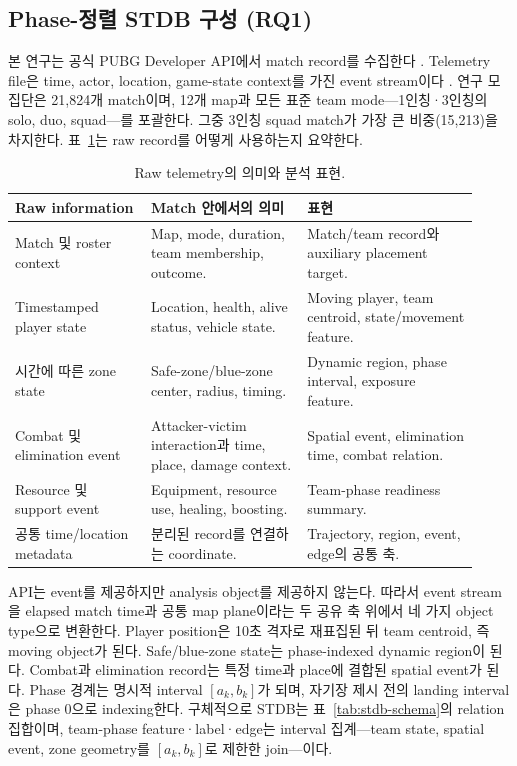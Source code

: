 \subsection{Phase-정렬 STDB 구성 (RQ1)}
\label{sec:methods-data}

본 연구는 공식 PUBG Developer API에서 match record를 수집한다
\cite{pubgDeveloperPortal,pubgTelemetryGuide}. Telemetry file은 time, actor,
location, game-state context를 가진 event stream이다
\cite{pubgTelemetryEvents,pubgTelemetryObjects}. 연구 모집단은 21,824개
match이며, 12개 map과 모든 표준 team mode---1인칭·3인칭의 solo, duo,
squad---를 포괄한다. 그중 3인칭 squad match가 가장 큰 비중(15,213)을
차지한다. 표~\ref{tab:api-fields}는 raw record를 어떻게 사용하는지 요약한다.

\begin{table}[t]
\centering
\caption{Raw telemetry의 의미와 분석 표현.}
\label{tab:api-fields}
\small
\begin{tabular}{p{0.27\linewidth}p{0.31\linewidth}p{0.34\linewidth}}
\toprule
Raw information & Match 안에서의 의미 & 표현 \\
\midrule
Match 및 roster context & Map, mode, duration, team membership, outcome. &
Match/team record와 auxiliary placement target. \\
Timestamped player state & Location, health, alive status, vehicle state. &
Moving player, team centroid, state/movement feature. \\
시간에 따른 zone state & Safe-zone/blue-zone center, radius, timing. &
Dynamic region, phase interval, exposure feature. \\
Combat 및 elimination event & Attacker-victim interaction과 time, place,
damage context. & Spatial event, elimination time, combat relation. \\
Resource 및 support event & Equipment, resource use, healing, boosting. &
Team-phase readiness summary. \\
공통 time/location metadata & 분리된 record를 연결하는 coordinate. &
Trajectory, region, event, edge의 공통 축. \\
\bottomrule
\end{tabular}
\end{table}

API는 event를 제공하지만 analysis object를 제공하지 않는다. 따라서 event
stream을 elapsed match time과 공통 map plane이라는 두 공유 축 위에서 네 가지
object type으로 변환한다. Player position은 10초 격자로 재표집된 뒤 team
centroid, 즉 moving object가 된다. Safe/blue-zone state는 phase-indexed
dynamic region이 된다. Combat과 elimination record는 특정 time과 place에
결합된 spatial event가 된다. Phase 경계는 명시적 interval
\([a_k,b_k]\)가 되며, 자기장 제시 전의 landing interval은 phase 0으로
indexing한다. 구체적으로 STDB는 표~\ref{tab:stdb-schema}의 relation
집합이며, team-phase feature·label·edge는 interval 집계---team state,
spatial event, zone geometry를 \([a_k,b_k]\)로 제한한 join---이다.

